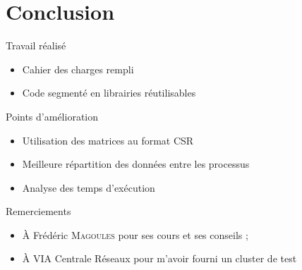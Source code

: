 \documentclass{beamer}
\begin{document}
  \section{Conclusion}
  
  \begin{frame}{Travail réalisé}
    \begin{itemize}
      \bigskip
      \item Cahier des charges rempli
      \bigskip
      \item Code segmenté en librairies réutilisables
      \bigskip
    \end{itemize}
  \end{frame}
  
  \begin{frame}{Points d'amélioration}
    \begin{itemize}
      \bigskip
      \item Utilisation des matrices au format CSR
      \bigskip
      \item Meilleure répartition des données entre les processus
      \bigskip
      \item Analyse des temps d'exécution
      \bigskip
    \end{itemize}
  \end{frame}
  
  \begin{frame}{Remerciements}
    \begin{itemize}
      \bigskip
      \item À Frédéric \textsc{Magoules} pour ses cours et ses conseils ;
      \bigskip
      \item À VIA Centrale Réseaux pour m'avoir fourni un cluster de test
    \end{itemize}
  \end{frame}


 
\end{document}
